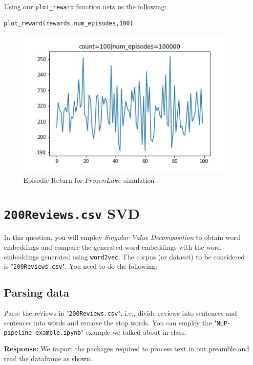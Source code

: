 \documentclass[12pt, letterpaper]{article}
\newcommand{\mybox}[1]{\par\noindent\colorbox{shadecolor}
{\parbox{\dimexpr\textwidth-2\fboxsep\relax}{#1}}}
\begin{document}
Using our \texttt{plot\_reward} function nets us the following:

\begin{mdframed}[backgroundcolor=shadecolor]
\begin{verbatim}
plot_reward(rewards,num_episodes,100)
\end{verbatim}
\end{mdframed}

\begin{figure}[hbt!]
    \caption{Episodic Return for $FrozenLake$ simulation}
    \centering
    \includegraphics{episodic_reward.jpg}
\end{figure}

\section{\texttt{200Reviews.csv} SVD}

\mybox{In this question, you will employ \textit{Singular Value Decomposition} to obtain word embeddings and compare the generated word embeddings with the word embeddings generated using \texttt{word2vec}. 
The corpus (or dataset) to be considered is "\texttt{200Reviews.csv}". You need to do the following:}

\subsection{Parsing data}
\mybox{Parse the reviews in "\texttt{200Reviews.csv}", i.e., divide reviews into sentences and sentences into words and remove the stop words. You can employ the "\texttt{NLP-pipeline-example.ipynb}" example we talked about in class.}

\textbf{Response:} We import the packages required to process text in our preamble and read the dataframe as shown.
\end{document}

